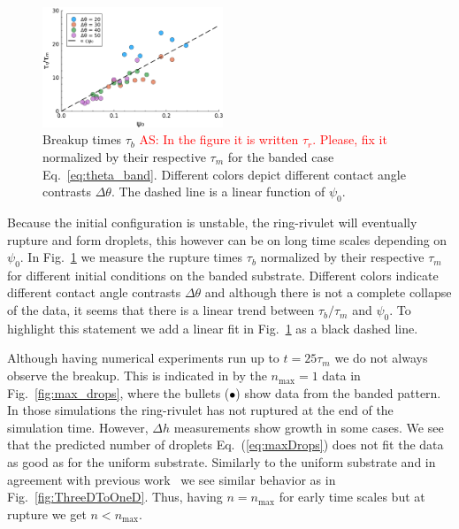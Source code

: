 \documentclass[twoside,twocolumn,9pt]{article}
\begin{document}
\begin{figure}
    \centering
    \includegraphics[width=0.48\textwidth]{assets/bandBreakup_timescales.pdf}
    \caption{Breakup times $\tau_b$ \textcolor{red}{AS: In the figure it is written $\tau_r$. Please, fix it} normalized by their respective $\tau_m$ for the banded case Eq.~\ref{eq:theta_band}.
    Different colors depict different contact angle contrasts $\Delta\theta$.
    The dashed line is a linear function of $\psi_0$. %
    }
    \label{fig:bandBreakupT}
\end{figure}
Because the initial configuration is unstable, the ring-rivulet will eventually rupture and form droplets, this however can be on long time scales depending on $\psi_0$.
In Fig.~\ref{fig:bandBreakupT} we measure the rupture times $\tau_b$ normalized by their respective $\tau_m$ for different initial conditions on the banded substrate.
Different colors indicate different contact angle contrasts $\Delta\theta$ and although there is not a complete collapse of the data, it seems that there is a linear trend between $\tau_b/\tau_m$ and $\psi_0$.
To highlight this statement we add a linear fit in Fig.~\ref{fig:bandBreakupT} as a black dashed line. 

Although having numerical experiments run up to $t = 25\tau_m$ we do not always observe the breakup. 
This is indicated in by the $n_{\max} = 1$ data in Fig.~\ref{fig:max_drops}, where the bullets (\textcolor{black}{$\bullet$}) show data from the banded pattern. 
In those simulations the ring-rivulet has not ruptured at the end of the simulation time.
However, $\Delta h$ measurements show growth in some cases.
We see that the predicted number of droplets Eq.~(\ref{eq:maxDrops}) does not fit the data as good as for the uniform substrate. 
Similarly to the uniform substrate and in agreement with previous work~\cite{gonzalezStabilityLiquidRing2013} we see similar behavior as in Fig.~\ref{fig:ThreeDToOneD}.
Thus, having $n = n_{\max}$ for early time scales but at rupture we get $n < n_{\max}$.
\end{document}

